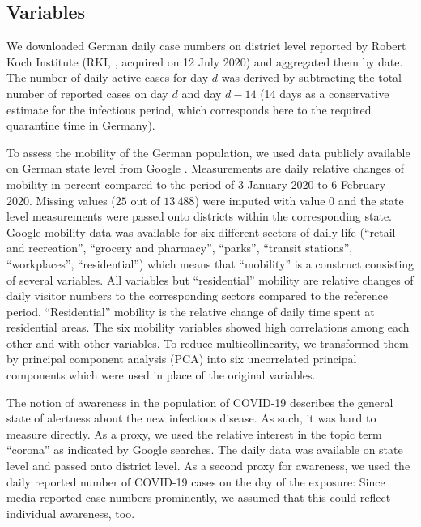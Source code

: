 \documentclass[]{elsarticle} %
\begin{document}
\hypertarget{variables}{%
\subsection{Variables}\label{variables}}

We downloaded German daily case numbers on district level reported by Robert Koch Institute (RKI, \citep{casenumbers_rki}, acquired on 12 July 2020) and aggregated them by date. The number of daily active cases for day \(d\) was derived by subtracting the total number of reported cases on day \(d\) and day \(d-14\) (14 days as a conservative estimate for the infectious period, which corresponds here to the required quarantine time in Germany).

To assess the mobility of the German population, we used data publicly available on German state level from Google \citep{google_mobility}. Measurements are daily relative changes of mobility in percent compared to the period of 3 January 2020 to 6 February 2020. Missing values (\(25\) out of \(13{\ }488\)) were imputed with value \(0\) and the state level measurements were passed onto districts within the corresponding state. Google mobility data was available for six different sectors of daily life (``retail and recreation'', ``grocery and pharmacy'', ``parks'', ``transit stations'', ``workplaces'', ``residential'') which means that ``mobility'' is a construct consisting of several variables. All variables but ``residential'' mobility are relative changes of daily visitor numbers to the corresponding sectors compared to the reference period. ``Residential'' mobility is the relative change of daily time spent at residential areas. The six mobility variables showed high correlations among each other and with other variables. To reduce multicollinearity, we transformed them by principal component analysis (PCA) into six uncorrelated principal components which were used in place of the original variables.

The notion of awareness in the population of COVID-19 describes the general state of alertness about the new infectious disease. As such, it was hard to measure directly. As a proxy, we used the relative interest in the topic term ``corona'' as indicated by Google searches. The daily data was available on state level \citep{google_trends} and passed onto district level. As a second proxy for awareness, we used the daily reported number of COVID-19 cases on the day of the exposure: Since media reported case numbers prominently, we assumed that this could reflect individual awareness, too.
\end{document}
